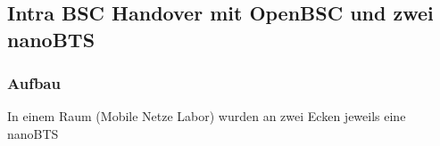 \label{sec:analyse}

\subsection{Intra BSC Handover mit OpenBSC und zwei nanoBTS}

\subsubsection{Aufbau}
In einem Raum (Mobile Netze Labor) wurden an zwei Ecken jeweils eine nanoBTS 

